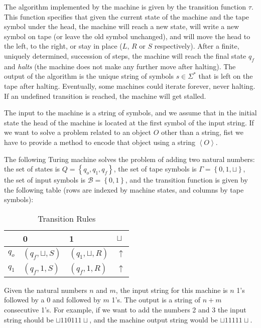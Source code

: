 The algorithm implemented by the machine is given by the transition function $\tau$. This function specifies that given the current state of the machine and the tape symbol under the head, the machine will reach a new state, will write a new symbol on tape (or leave the old symbol unchanged), and will move the head to the left, to the right, or stay in place ($L$, $R$ or $S$ respectively). After a finite, uniquely determined, succession of steps, the machine will reach the final state $q_f$ and \emph{halts} (the machine does not make any further move after halting). The output of the algorithm is the unique string of symbols $s \in \Sigma^\ast$  that is left on the tape after halting. Eventually, some machines could iterate forever, never halting. If an undefined transition is reached, the machine will get stalled.

The input to the machine is a string of symbols, and we assume that in the initial state the head of the machine is located at the first symbol of the input string. If we want to solve a problem related to an object $O$ other than a string, fist we have to provide a method to encode that object using a string $\left\langle O \right\rangle$.

\begin{example}
\label{ex:Turing-Machine}
The following Turing machine solves the problem of adding two natural numbers: the set of states is $Q = \left\{q_{o}, q_{1}, q_{f}\right\}$, the set of tape symbols is $\Gamma = \left\{0, 1, \sqcup \right\}$, the set of input symbols is $\mathcal{B} = \left\{0, 1 \right\}$, and the transition function is given by the following table (rows are indexed by machine states, and columns by tape symbols):

\begin{table}[h]
\centering
\begin{tabular}{l l l l}
\toprule
 & 0 & 1 & $\sqcup$ \\
\midrule
$q_{o}$ & $\left(q_{f}, \sqcup, S\right)$ & $\left(q_{1}, \sqcup, R\right)$ & $\uparrow$ \\
$q_{1}$ & $\left(q_{f}, 1     , S\right)$ & $\left(q_{f}, 1     , R\right)$ & $\uparrow$ \\
\bottomrule
\end{tabular}
\caption{Transition Rules}
\end{table}

Given the natural numbers $n$ and $m$, the input string for this machine is $n$ 1's followed by a $0$ and followed by $m$ 1's. The output is a string of $n+m$ consecutive 1's. For example, if we want to add the numbers 2 and 3 the input string should be $\sqcup 1 1 0 1 1 1 \sqcup$, and the machine output string would be $\sqcup 1 1 1 1 1 \sqcup$.
\end{example}

